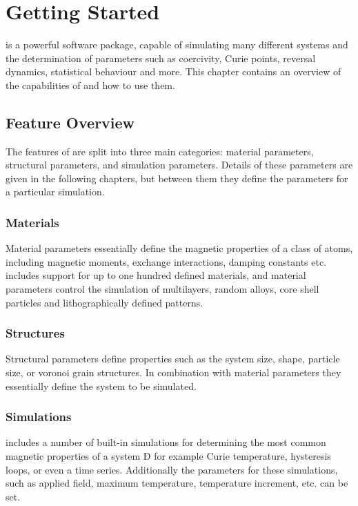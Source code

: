 \chapter{Getting Started}\label{chap:gettingstarted}

\vampire is a powerful software package, capable of simulating many different systems and the determination of parameters such as coercivity, Curie points, reversal dynamics, statistical behaviour and more. This chapter contains an overview of the capabilities of \vampire and how to use them.

\section*{Feature Overview}
The features of \vampire are split into three main categories: material parameters, structural parameters, and simulation parameters. Details of these parameters are given in the following chapters, but between them they define the parameters for a particular simulation.

\subsection*{Materials}
Material parameters essentially define the magnetic properties of a class of atoms, including magnetic moments, exchange interactions, damping constants etc. \vampire includes support for up to one hundred defined materials, and material parameters control the simulation of multilayers, random alloys, core shell particles and lithographically defined patterns.

\subsection*{Structures}
Structural parameters define properties such as the system size, shape, particle size, or voronoi grain structures. In combination with material parameters they essentially define the system to be simulated. 

\subsection*{Simulations}
\vampire includes a number of built-in simulations for determining the most common magnetic properties of a system Ð for example Curie temperature, hysteresis loops, or even a time series. Additionally the parameters for these simulations, such as applied field, maximum temperature, temperature increment, etc. can be set. 

